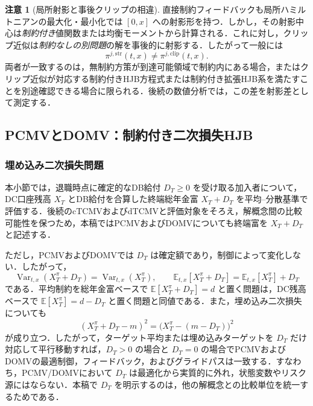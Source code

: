 \documentclass[10pt,a4paper]{article}
\theoremstyle{plain}
\theoremstyle{definition}
\newtheorem{remark}{注意}
\newcommand{\E}{\mathbb{E}}
\DeclareMathOperator{\Var}{Var}
\begin{document}
\begin{remark}[局所射影と事後クリップの相違]
直接制約フィードバックも局所ハミルトニアンの最大化・最小化では $[0,x]$ への射影形を持つ．しかし，その射影中心は\emph{制約付き}値関数または均衡モーメントから計算される．これに対し，クリップ近似は\emph{制約なしの別問題}の解を事後的に射影する．したがって一般には
\[
  \pi^{j,\mathrm{str}}(t,x)\neq\pi^{j,\mathrm{clip}}(t,x).
\]
両者が一致するのは，無制約方策が到達可能領域で制約内にある場合，またはクリップ近似が対応する制約付きHJB方程式または制約付き拡張HJB系を満たすことを別途確認できる場合に限られる．後続の数値分析では，この差を射影差として測定する．
\end{remark}

\subsection{PCMVとDOMV：制約付き二次損失HJB}
\label{sec:pcmv-domv}

\subsubsection{埋め込み二次損失問題}

本小節では，退職時点に確定的なDB給付 $D_T\geq0$ を受け取る加入者について，DC口座残高 $X_T$ とDB給付を合算した終端総年金富 $X_T+D_T$ を平均--分散基準で評価する．後続のcTCMVおよびdTCMVと評価対象をそろえ，解概念間の比較可能性を保つため，本稿ではPCMVおよびDOMVについても終端富を $X_T+D_T$ と記述する．

ただし，PCMVおよびDOMVでは $D_T$ は確定額であり，制御によって変化しない．したがって，
\begin{equation}
  \Var_{t,x}(X_T^\pi+D_T)=\Var_{t,x}(X_T^\pi),
  \qquad
  \E_{t,x}[X_T^\pi+D_T]=\E_{t,x}[X_T^\pi]+D_T
  \label{eq:deterministic-db-shift}
\end{equation}
である．平均制約を総年金富ベースで $\E[X_T^\pi+D_T]=d$ と置く問題は，DC残高ベースで $\E[X_T^\pi]=d-D_T$ と置く問題と同値である．また，埋め込み二次損失についても
\begin{equation}
  (X_T^\pi+D_T-m)^2
  =\bigl(X_T^\pi-(m-D_T)\bigr)^2
  \label{eq:deterministic-db-target-shift}
\end{equation}
が成り立つ．したがって，ターゲット平均または埋め込みターゲットを $D_T$ だけ対応して平行移動すれば，$D_T>0$ の場合と $D_T=0$ の場合でPCMVおよびDOMVの最適制御，フィードバック，およびグライドパスは一致する．すなわち，PCMV/DOMVにおいて $D_T$ は最適化から実質的に外れ，状態変数やリスク源にはならない．本稿で $D_T$ を明示するのは，他の解概念との比較単位を統一するためである．
\end{document}
